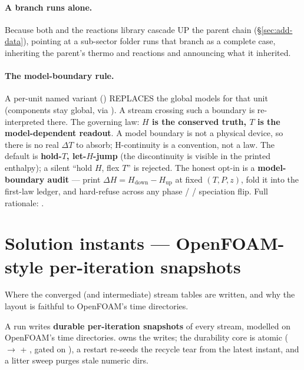 \documentclass[11pt,a4paper]{article}
\begin{document}
\paragraph{A branch runs alone.}  Because both 
and the
reactions library cascade UP the parent chain (\S\ref{sec:add-data}), pointing
 at a sub-sector folder runs that branch as a complete case,
inheriting the parent's thermo and reactions and announcing what it inherited.

\paragraph{The model-boundary rule.}  A per-unit named variant ()
REPLACES the global models for that unit (components stay global, via
).  A stream crossing such a boundary is re-interpreted there.
The governing law: \textbf{\(H\) is the conserved truth, \(T\) is the
model-dependent readout}.  A model boundary is not a physical device, so there
is no real \(\Delta T\) to absorb; H-continuity is a convention, not a law.  The
default is \textbf{hold-\(T\), let-\(H\)-jump} (the discontinuity is visible in
the printed enthalpy); a silent ``hold \(H\), flex \(T\)'' is rejected.  The
honest opt-in is a \textbf{model-boundary audit} --- print \(\Delta H =
H_{\mathrm{down}}-H_{\mathrm{up}}\) at fixed \((T,P,z)\), fold it into the
first-law ledger, and hard-refuse across any phase /  / speciation
flip.  Full rationale: .

\section{Solution instants --- OpenFOAM-style per-iteration snapshots}
\label{sec:instants}

\begin{whatyoulllearn}
Where the converged (and intermediate) stream tables are written, and why the
layout is faithful to OpenFOAM's time directories.
\end{whatyoulllearn}

A run writes \textbf{durable per-iteration snapshots} of every stream, modelled
on OpenFOAM's time directories.   owns the writes;
the durability core is atomic ( $\to$  + ,
gated on ), a restart re-seeds the recycle tear from the latest
instant, and a litter sweep purges stale numeric dirs.
\end{document}
